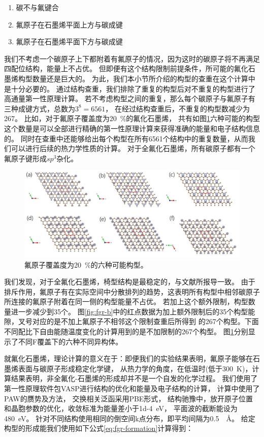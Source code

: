 \begin{enumerate}
  \item 碳不与氟键合
  \item 氟原子在石墨烯平面上方与碳成键
  \item 氟原子在石墨烯平面下方与碳成键
\end{enumerate}

我们不考虑一个碳原子上下都附着有氟原子的情况，因为这时的碳原子将不再满足四配位结构，能量上不占优。
但即便有这个结构限制前提条件，所可能的氟化石墨烯构型数量还是巨大的。
为此，我们本小节所介绍的构型的查重在这个计算中是十分必要的。
通过结构查重，我们排除了重复的构型后对不重复的构型进行了高通量第一性原理计算。
若不考虑构型之间的重复，那么每个碳原子与氟原子有三种成键方式，总数为$3^8=6561$，
在经过结构查重后，不重复的构型数减少为\num{267}。
比如，对于氟原子覆盖度为\SI{20}{\percent}的氟化石墨烯，
共有如图\ref{fig:fgr-6}六种可能的构型
这个数量是可以全部进行精确的第一性原理计算来获得准确的能量和电子结构信息的。
同时在查重中还能够给出每个构型在所有\num{6561}个结构中的重复数量，从而我们可以进行后续的热力学性质的计算。
对于全氟化石墨烯，所有碳原子都有一个氟原子键形成$sp^3$杂化。

\begin{figure}[htb]
  \includegraphics[width=1.0\textwidth]{figs/fgr-6.png}
  \centering
  \caption{氟原子覆盖度为\SI{20}{\percent}的六种可能构型。}
  \label{fig:fgr-6}
\end{figure}

我们发现，对于全氟化石墨烯，椅型结构是最稳定的，与文献\cite{leenaerts2010first}所报导一致。
由于排斥作用，氟原子有在实际空间中分散排列的趋势，这表明所有构型中相邻碳原子所连接的氟原子附着在同一侧的构型能量不占优。
若加上这个额外限制，构型数量进一步减少到35个。
图\ref{fig:fgr-b}中的红点数据为加上额外限制后的35个构型能隙，叉号对应的是不加上氟原子不相邻这个限制查重后所得到
的267个构型。下面不同配比下自由能随温度变化的计算用到的是不加限制的267个构型。
图\ref{fig:fgr-6}分别显示了不同F覆盖下的六种不同异构体。

就氟化石墨烯，理论计算的意义在于：即便我们的实验结果表明，氟原子能够在石墨烯表面与碳原子形成稳定化学键，
从热力学的角度，在低温时(低于\SI{300}{\kelvin})，计算结果表明，非全氟化-石墨烯的形成却并不是一个自发的化学过程。
我们使用了第一性原理软件包VASP\cite{hafner1997vienna}进行结构的优化和能量及电子结构的计算，
计算中使用了PAW的赝势及方法\cite{blochl1994projector}，
交换相关泛函采用PBE形式\cite{perdew1996generalized}，
结构驰豫中，放开原子位置和晶胞参数的优化，收敛标准为能量差小于\SI{1d-4}{\eV}，
平面波的截断能设为\SI{480}{\eV}。
针对不同结构使用相同的倒空间k点分布，即平均间隔为\SI{0.5}{\per\angstrom}。
给定构型的形成能我们使用如下公式\ref{eq:fgr-formation}计算得到：

